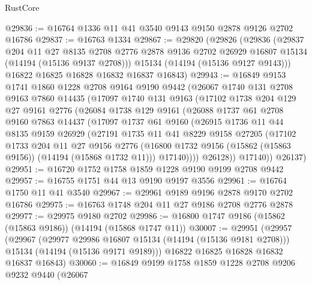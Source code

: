 \begin{lexlean}{RustCore}
\begin{coremodule}
@29836 := @16764 @1336 @11 @41 @3540 @9143 @9150 @2878 @9126 @2702 @16786
@29837 := @16763 @1334
@29867 := @29820
    (@29826
      (@29836
        (@29837
          @204
          @11
          @27
          @8135
          @2708
          @2776
          @2878
          @9136
          @2702
          @26929
          @16807
          @15134
          (@14194 (@15136 @9137 @2708)))
        @15134
        (@14194 (@15136 @9127 @9143)))
      @16822
      @16825
      @16828
      @16832
      @16837
      @16843)
@29943 := @16849
    @9153
    @1741
    @1860
    @1228
    @2708
    @9164
    @9190
    @9442
    (@26067
      @1740
      @131
      @2708
      @9163
      @7860
      @14435
      (@17097
        @1740
        @131
        @9163
        (@17102
          @1738
          @204
          @129
          @27
          @9161
          @2776
          (@26084
            @1738
            @129
            @9161
            (@26088
              @1737
              @61
              @2708
              @9160
              @7863
              @14437
              (@17097
                @1737
                @61
                @9160
                (@26915
                  @1736
                  @11
                  @44
                  @8135
                  @9159
                  @26929
                  (@27191
                    @1735
                    @11
                    @41
                    @8229
                    @9158
                    @27205
                    (@17102
                      @1733
                      @204
                      @11
                      @27
                      @9156
                      @2776
                      (@16800 @1732 @9156 (@15862 (@15863 @9156)) (@14194 (@15868 @1732 @11)))
                      @17140))))
              @26128))
          @17140))
      @26137)
@29951 := @16720 @1752 @1758 @1859 @1228 @9190 @9199 @2708 @9442
@29957 := @16755 @1751 @44 @13 @9190 @9197 @3556
@29961 := @16764 @1750 @11 @41 @3540
@29967 := @29961 @9189 @9196 @2878 @9170 @2702 @16786
@29975 := @16763 @1748 @204 @11 @27 @9186 @2708 @2776 @2878
@29977 := @29975 @9180 @2702
@29986 := @16800 @1747 @9186 (@15862 (@15863 @9186)) (@14194 (@15868 @1747 @11))
@30007 := @29951
    (@29957
      (@29967
        (@29977 @29986 @16807 @15134 (@14194 (@15136 @9181 @2708)))
        @15134
        (@14194 (@15136 @9171 @9189)))
      @16822
      @16825
      @16828
      @16832
      @16837
      @16843)
@30060 := @16849
    @9199
    @1758
    @1859
    @1228
    @2708
    @9206
    @9232
    @9440
    (@26067

\end{coremodule}
\end{lexlean}
